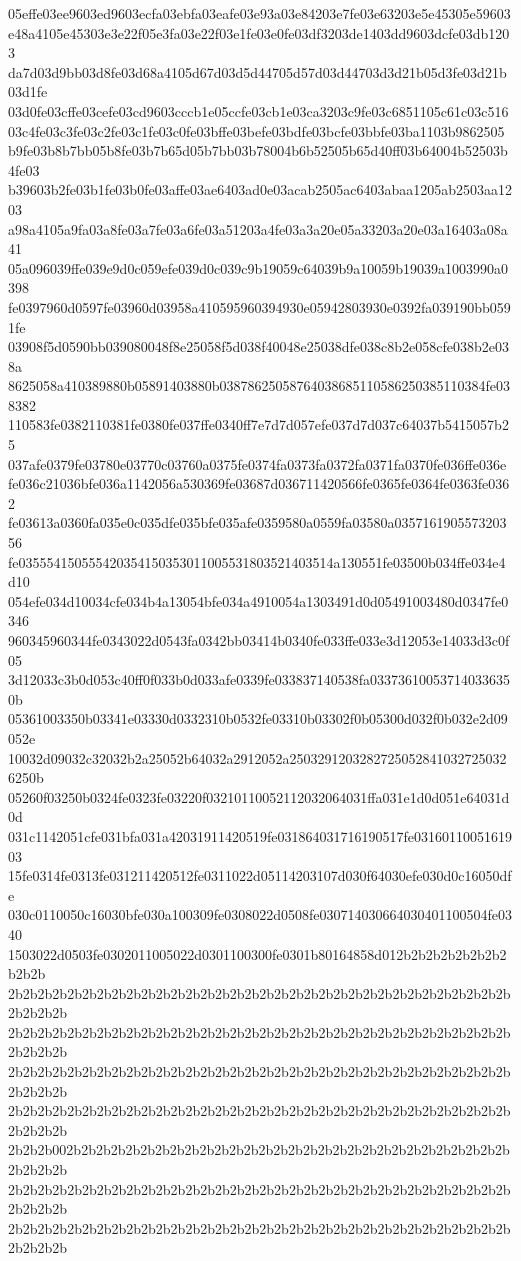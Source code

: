 05effe03ee9603ed9603ecfa03ebfa03eafe03e93a03e84203e7fe03e63203e5e45305e59603
e48a4105e45303e3e22f05e3fa03e22f03e1fe03e0fe03df3203de1403dd9603dcfe03db1203
da7d03d9bb03d8fe03d68a4105d67d03d5d44705d57d03d44703d3d21b05d3fe03d21b03d1fe
03d0fe03cffe03cefe03cd9603cccb1e05ccfe03cb1e03ca3203c9fe03c6851105c61c03c516
03c4fe03c3fe03c2fe03c1fe03c0fe03bffe03befe03bdfe03bcfe03bbfe03ba1103b9862505
b9fe03b8b7bb05b8fe03b7b65d05b7bb03b78004b6b52505b65d40ff03b64004b52503b4fe03
b39603b2fe03b1fe03b0fe03affe03ae6403ad0e03acab2505ac6403abaa1205ab2503aa1203
a98a4105a9fa03a8fe03a7fe03a6fe03a51203a4fe03a3a20e05a33203a20e03a16403a08a41
05a096039ffe039e9d0c059efe039d0c039c9b19059c64039b9a10059b19039a1003990a0398
fe0397960d0597fe03960d03958a410595960394930e05942803930e0392fa039190bb0591fe
03908f5d0590bb039080048f8e25058f5d038f40048e25038dfe038c8b2e058cfe038b2e038a
8625058a410389880b05891403880b03878625058764038685110586250385110384fe038382
110583fe0382110381fe0380fe037ffe0340ff7e7d7d057efe037d7d037c64037b5415057b25
037afe0379fe03780e03770c03760a0375fe0374fa0373fa0372fa0371fa0370fe036ffe036e
fe036c21036bfe036a1142056a530369fe03687d036711420566fe0365fe0364fe0363fe0362
fe03613a0360fa035e0c035dfe035bfe035afe0359580a0559fa03580a035716190557320356
fe035554150555420354150353011005531803521403514a130551fe03500b034ffe034e4d10
054efe034d10034cfe034b4a13054bfe034a4910054a1303491d0d05491003480d0347fe0346
960345960344fe0343022d0543fa0342bb03414b0340fe033ffe033e3d12053e14033d3c0f05
3d12033c3b0d053c40ff0f033b0d033afe0339fe033837140538fa033736100537140336350b
05361003350b03341e03330d0332310b0532fe03310b03302f0b05300d032f0b032e2d09052e
10032d09032c32032b2a25052b64032a2912052a25032912032827250528410327250326250b
05260f03250b0324fe0323fe03220f03210110052112032064031ffa031e1d0d051e64031d0d
031c1142051cfe031bfa031a42031911420519fe031864031716190517fe0316011005161903
15fe0314fe0313fe031211420512fe0311022d05114203107d030f64030efe030d0c16050dfe
030c0110050c16030bfe030a100309fe0308022d0508fe030714030664030401100504fe0340
1503022d0503fe0302011005022d0301100300fe0301b80164858d012b2b2b2b2b2b2b2b2b2b
2b2b2b2b2b2b2b2b2b2b2b2b2b2b2b2b2b2b2b2b2b2b2b2b2b2b2b2b2b2b2b2b2b2b2b2b2b2b
2b2b2b2b2b2b2b2b2b2b2b2b2b2b2b2b2b2b2b2b2b2b2b2b2b2b2b2b2b2b2b2b2b2b2b2b2b2b
2b2b2b2b2b2b2b2b2b2b2b2b2b2b2b2b2b2b2b2b2b2b2b2b2b2b2b2b2b2b2b2b2b2b2b2b2b2b
2b2b2b2b2b2b2b2b2b2b2b2b2b2b2b2b2b2b2b2b2b2b2b2b2b2b2b2b2b2b2b2b2b2b2b2b2b2b
2b2b2b002b2b2b2b2b2b2b2b2b2b2b2b2b2b2b2b2b2b2b2b2b2b2b2b2b2b2b2b2b2b2b2b2b2b
2b2b2b2b2b2b2b2b2b2b2b2b2b2b2b2b2b2b2b2b2b2b2b2b2b2b2b2b2b2b2b2b2b2b2b2b2b2b
2b2b2b2b2b2b2b2b2b2b2b2b2b2b2b2b2b2b2b2b2b2b2b2b2b2b2b2b2b2b2b2b2b2b2b2b2b2b

